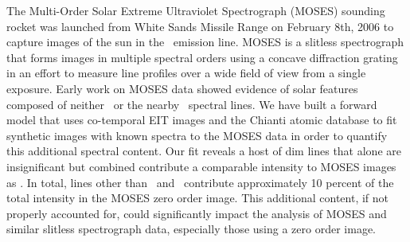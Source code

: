 The Multi-Order Solar Extreme Ultraviolet Spectrograph (MOSES) sounding rocket was launched from White Sands Missile Range on February 8th, 2006 to capture images of the sun in the \heii \ emission line.
MOSES is a slitless spectrograph that forms images in multiple spectral orders using a concave diffraction grating in an effort to measure line profiles over a wide field of view from a single exposure.
Early work on MOSES data showed evidence of solar features composed of neither \heii \ or the nearby \sixi \ spectral lines.
We have built a forward model that uses co-temporal EIT images and the Chianti atomic database to fit synthetic images with known spectra to the MOSES data in order to quantify this additional spectral content.
Our fit reveals a host of dim lines that alone are insignificant but combined contribute a comparable intensity to MOSES images as \sixi.
In total, lines other than \heii\ and \sixi\ contribute approximately 10 percent of the total intensity in the MOSES zero order image.
This additional content, if not properly accounted for, could significantly impact the analysis of MOSES and similar slitless spectrograph data, especially those using a zero order image.